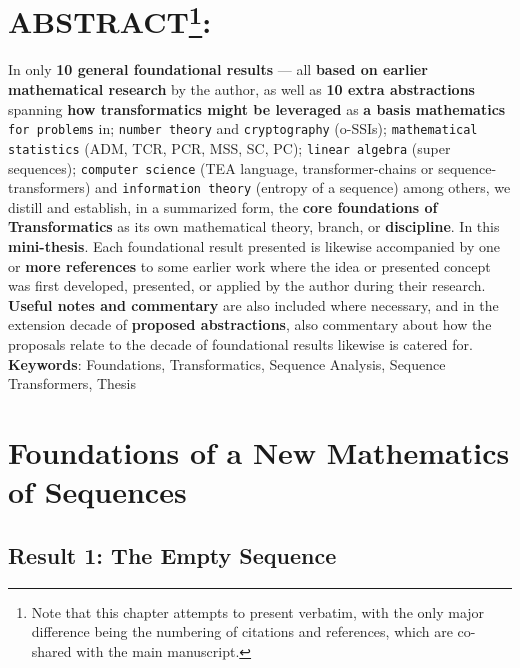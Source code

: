 \documentclass[a4paper, 18pt]{book} %
\begin{document}
\section*{ABSTRACT\footnote{Note that this chapter attempts to present \cite{Lutalo2025_transformatics_thesis} verbatim, with the only major difference being the numbering of citations and references, which are co-shared with the main manuscript.}:}
In only \textbf{10 general foundational results}\cite{lutalo_2025_trans101_1page} --- all \textbf{based on earlier mathematical research} by the author, as well as \textbf{10 extra abstractions} spanning \textbf{how transformatics might be leveraged} as \textbf{a basis mathematics} \texttt{for problems} in; \texttt{number theory} and \texttt{cryptography} (o-SSIs); \texttt{mathematical statistics} (ADM, TCR, PCR, MSS, SC, PC); \texttt{linear algebra} (super sequences); \texttt{computer science} (TEA language, transformer-chains or sequence-transformers) and \texttt{information theory} (entropy of a sequence) among others, we distill and establish, in a summarized form, the \textbf{core foundations of Transformatics}\cite{transformatics} as its own mathematical theory, branch, or \textbf{discipline}. In this \textbf{mini-thesis}. Each foundational result presented is likewise accompanied by one or \textbf{more references} to some earlier work where the idea or presented concept was first developed, presented, or applied by the author during their research. \textbf{Useful notes and commentary} are also included where necessary, and in the extension decade of \textbf{proposed abstractions}, also commentary about how the proposals relate to the decade of foundational results likewise is catered for.
 \newline\newline
     \textbf{Keywords}: Foundations, Transformatics, Sequence Analysis,  Sequence Transformers, Thesis

\section{Foundations of a New Mathematics of Sequences}
\label{SECFOUND}

\subsection{Result 1: The Empty Sequence\cite{lnspaper}}
\label{RES1}
\end{document}

